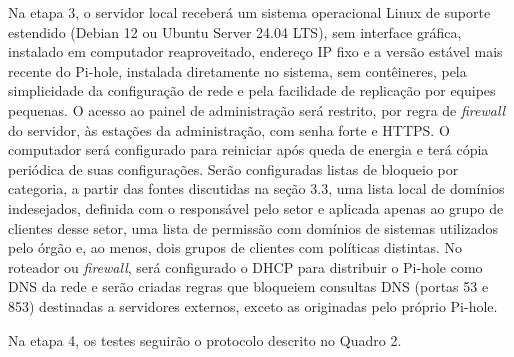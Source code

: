 \documentclass[12pt,a4paper]{article}
\begin{document}
Na etapa 3, o servidor local receberá um sistema operacional Linux de suporte estendido (Debian 12 ou Ubuntu Server 24.04 LTS), sem interface gráfica, instalado em computador reaproveitado, endereço IP fixo e a versão estável mais recente do Pi-hole, instalada diretamente no sistema, sem contêineres, pela simplicidade da configuração de rede e pela facilidade de replicação por equipes pequenas. O acesso ao painel de administração será restrito, por regra de \textit{firewall} do servidor, às estações da administração, com senha forte e HTTPS. O computador será configurado para reiniciar após queda de energia e terá cópia periódica de suas configurações. Serão configuradas listas de bloqueio por categoria, a partir das fontes discutidas na seção 3.3, uma lista local de domínios indesejados, definida com o responsável pelo setor e aplicada apenas ao grupo de clientes desse setor, uma lista de permissão com domínios de sistemas utilizados pelo órgão e, ao menos, dois grupos de clientes com políticas distintas. No roteador ou \textit{firewall}, será configurado o DHCP para distribuir o Pi-hole como DNS da rede e serão criadas regras que bloqueiem consultas DNS (portas 53 e 853) destinadas a servidores externos, exceto as originadas pelo próprio Pi-hole.

Na etapa 4, os testes seguirão o protocolo descrito no Quadro 2.
\end{document}

